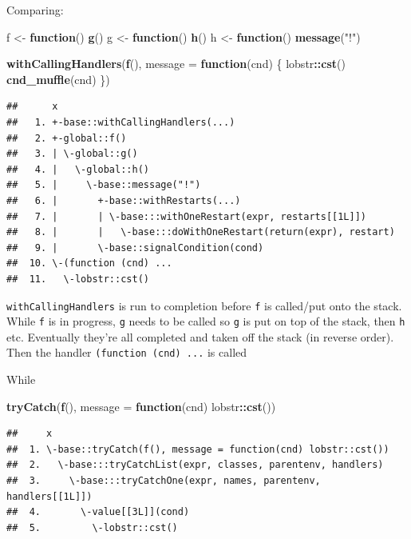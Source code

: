 \documentclass[]{book}
\newenvironment{Shaded}{\begin{snugshade}}{\end{snugshade}}
\newcommand{\ControlFlowTok}[1]{\textcolor[rgb]{0.13,0.29,0.53}{\textbf{#1}}}
\newcommand{\DataTypeTok}[1]{\textcolor[rgb]{0.13,0.29,0.53}{#1}}
\newcommand{\KeywordTok}[1]{\textcolor[rgb]{0.13,0.29,0.53}{\textbf{#1}}}
\newcommand{\NormalTok}[1]{#1}
\newcommand{\OperatorTok}[1]{\textcolor[rgb]{0.81,0.36,0.00}{\textbf{#1}}}
\newcommand{\StringTok}[1]{\textcolor[rgb]{0.31,0.60,0.02}{#1}}
\begin{document}
Comparing:

\begin{Shaded}
\begin{Highlighting}[]
\NormalTok{f <-}\StringTok{ }\ControlFlowTok{function}\NormalTok{() }\KeywordTok{g}\NormalTok{()}
\NormalTok{g <-}\StringTok{ }\ControlFlowTok{function}\NormalTok{() }\KeywordTok{h}\NormalTok{()}
\NormalTok{h <-}\StringTok{ }\ControlFlowTok{function}\NormalTok{() }\KeywordTok{message}\NormalTok{(}\StringTok{"!"}\NormalTok{)}

\KeywordTok{withCallingHandlers}\NormalTok{(}\KeywordTok{f}\NormalTok{(), }\DataTypeTok{message =} \ControlFlowTok{function}\NormalTok{(cnd) \{}
\NormalTok{  lobstr}\OperatorTok{::}\KeywordTok{cst}\NormalTok{()}
  \KeywordTok{cnd_muffle}\NormalTok{(cnd)}
\NormalTok{\})}
\end{Highlighting}
\end{Shaded}

\begin{verbatim}
##      x
##   1. +-base::withCallingHandlers(...)
##   2. +-global::f()
##   3. | \-global::g()
##   4. |   \-global::h()
##   5. |     \-base::message("!")
##   6. |       +-base::withRestarts(...)
##   7. |       | \-base:::withOneRestart(expr, restarts[[1L]])
##   8. |       |   \-base:::doWithOneRestart(return(expr), restart)
##   9. |       \-base::signalCondition(cond)
##  10. \-(function (cnd) ...
##  11.   \-lobstr::cst()
\end{verbatim}

\texttt{withCallingHandlers} is run to completion before \texttt{f} is called/put onto the stack. While \texttt{f} is in progress, \texttt{g} needs to be called so \texttt{g} is put on top of the stack, then \texttt{h} etc. Eventually they're all completed and taken off the stack (in reverse order). Then the handler \texttt{(function\ (cnd)\ ...} is called

While

\begin{Shaded}
\begin{Highlighting}[]
\KeywordTok{tryCatch}\NormalTok{(}\KeywordTok{f}\NormalTok{(), }\DataTypeTok{message =} \ControlFlowTok{function}\NormalTok{(cnd) lobstr}\OperatorTok{::}\KeywordTok{cst}\NormalTok{())}
\end{Highlighting}
\end{Shaded}

\begin{verbatim}
##     x
##  1. \-base::tryCatch(f(), message = function(cnd) lobstr::cst())
##  2.   \-base:::tryCatchList(expr, classes, parentenv, handlers)
##  3.     \-base:::tryCatchOne(expr, names, parentenv, handlers[[1L]])
##  4.       \-value[[3L]](cond)
##  5.         \-lobstr::cst()
\end{verbatim}
\end{document}
